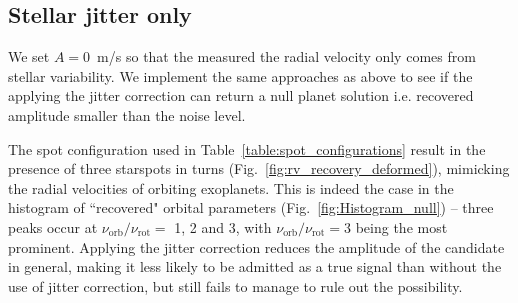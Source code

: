 \subsection{Stellar jitter only}

We set $A=0$~m/s so that the measured the radial velocity only comes from stellar variability. We implement the same approaches as above to see if the applying the jitter correction can return a null planet solution i.e. recovered amplitude smaller than the noise level.

The spot configuration used in Table~\ref{table:spot_configurations} result in the presence of three starspots in turns (Fig.~\ref{fig:rv_recovery_deformed}), mimicking the radial velocities of orbiting exoplanets. This is indeed the case in the histogram of ``recovered" orbital parameters (Fig.~\ref{fig:Histogram_null}) -- three peaks occur at $\nu_\text{orb}/\nu_\text{rot} =$ 1, 2 and 3, with $\nu_\text{orb}/\nu_\text{rot} = 3$ being the most prominent. Applying the jitter correction reduces the amplitude of the candidate in general, making it less likely to be admitted as a true signal than without the use of jitter correction, but still fails to manage to rule out the possibility. 

